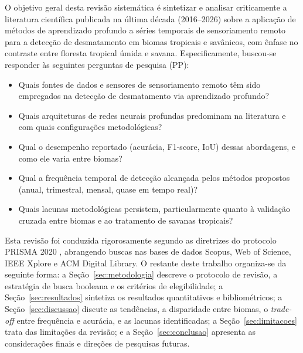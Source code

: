 \documentclass[12pt,a4paper]{article}
\begin{document}
O objetivo geral desta revisão sistemática é sintetizar e analisar criticamente a literatura científica publicada na última década (2016--2026) sobre a aplicação de métodos de aprendizado profundo a séries temporais de sensoriamento remoto para a detecção de desmatamento em biomas tropicais e savânicos, com ênfase no contraste entre floresta tropical úmida e savana. Especificamente, buscou-se responder às seguintes perguntas de pesquisa (PP):

\begin{itemize}
    \item[\textbf{PP1.}] Quais fontes de dados e sensores de sensoriamento remoto têm sido empregados na detecção de desmatamento via aprendizado profundo?
    \item[\textbf{PP2.}] Quais arquiteturas de redes neurais profundas predominam na literatura e com quais configurações metodológicas?
    \item[\textbf{PP3.}] Qual o desempenho reportado (acurácia, F1-score, IoU) dessas abordagens, e como ele varia entre biomas?
    \item[\textbf{PP4.}] Qual a frequência temporal de detecção alcançada pelos métodos propostos (anual, trimestral, mensal, quase em tempo real)?
    \item[\textbf{PP5.}] Quais lacunas metodológicas persistem, particularmente quanto à validação cruzada entre biomas e ao tratamento de savanas tropicais?
\end{itemize}

Esta revisão foi conduzida rigorosamente segundo as diretrizes do protocolo PRISMA 2020 \citep{page2021prisma}, abrangendo buscas nas bases de dados Scopus, Web of Science, IEEE Xplore e ACM Digital Library. O restante deste trabalho organiza-se da seguinte forma: a Seção~\ref{sec:metodologia} descreve o protocolo de revisão, a estratégia de busca booleana e os critérios de elegibilidade; a Seção~\ref{sec:resultados} sintetiza os resultados quantitativos e bibliométricos; a Seção~\ref{sec:discussao} discute as tendências, a disparidade entre biomas, o \textit{trade-off} entre frequência e acurácia, e as lacunas identificadas; a Seção~\ref{sec:limitacoes} trata das limitações da revisão; e a Seção~\ref{sec:conclusao} apresenta as considerações finais e direções de pesquisas futuras.
\end{document}
